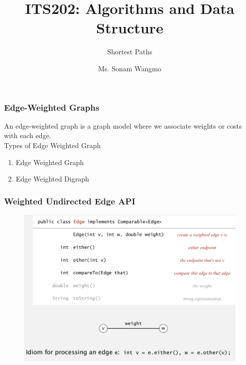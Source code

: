 \documentclass[11pt]{beamer}
\begin{document}
	\author{Ms. Sonam Wangmo}
	\title{ITS202: Algorithms and Data Structure}
	\subtitle{Shortest Paths}
	\institute{
		\textcolor{blue}{Gyalpozhing College of Information Technology \\ Royal University of Bhutan} \\
		\vspace{0.5cm}
	}
	\begin{frame}[plain]
		\maketitle
	\end{frame}

  \begin{frame}
 	\frametitle	{Edge-Weighted Graphs} 
 	\alert{An edge-weighted graph is a graph model where we associate weights or costs with each edge.}\\
 	Types of Edge Weighted Graph
 	\begin{enumerate}
 		\item Edge Weighted Graph
 		\item Edge Weighted Digraph
 	\end{enumerate}  
 \end{frame}

  \begin{frame}
	\frametitle	{Weighted Undirected Edge API } 

	\begin{figure}
		\centering
		\includegraphics[width=1\linewidth]{"Screenshot 2020-12-06 at 3.14.21 PM"}
		\label{fig:screenshot-2020-12-06-at-3}
	\end{figure}
\end{frame}
\end{document}
